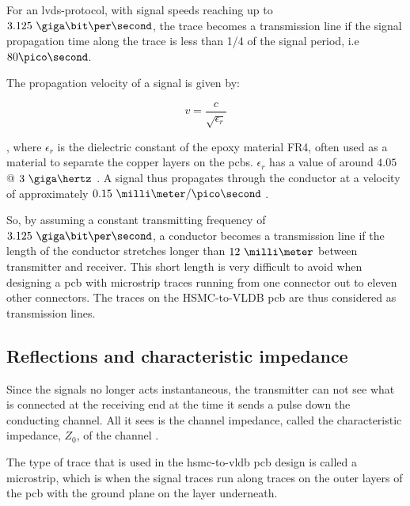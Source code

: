 \documentclass[main.tex]{subfiles}
\begin{document}
For an \gls{lvds}-protocol, with signal speeds reaching up to $3.125\ \giga\bit\per\second$, the trace becomes a transmission line if the signal propagation time along the trace is less than 1/4 of the signal period, i.e $80\pico\second$. 

The propagation velocity of a signal is given by:

\begin{equation}
    v = \frac{c}{\sqrt{\epsilon_r}}
\end{equation}

, where $\epsilon_r$ is the dielectric constant of the epoxy material FR4, often used as a material to separate the copper layers on the \glspl{pcb}. $\epsilon_r$ has a value of around $4.05$ @ $3\ \giga\hertz$ \cite{polar15}.
A signal thus propagates through the conductor at a velocity of approximately $0.15\ \milli\meter/\pico\second$ \cite[example 13.7]{weste11}.

So, by assuming a constant transmitting frequency of $3.125\ \giga\bit\per\second$, a conductor becomes a transmission line if the length of the conductor stretches longer than $12\ \milli\meter$ between transmitter and receiver. This short length is very difficult to avoid when designing a \gls{pcb} with microstrip traces running from one connector out to eleven other connectors. The traces on the HSMC-to-VLDB \gls{pcb} are thus considered as transmission lines. 

\subsection{Reflections and characteristic impedance}

Since the signals no longer acts instantaneous, the transmitter can not see what is connected at the receiving end at the time it sends a pulse down the conducting channel. All it sees is the channel impedance, called the characteristic impedance, $Z_0$, of the channel \cite{weste11}.

The type of trace that is used in the \gls{hsmc}-to-\gls{vldb} \gls{pcb} design is called a microstrip, which is when the signal traces run along traces on the outer layers of the \gls{pcb} with the ground plane on the layer underneath. 

\end{document}
